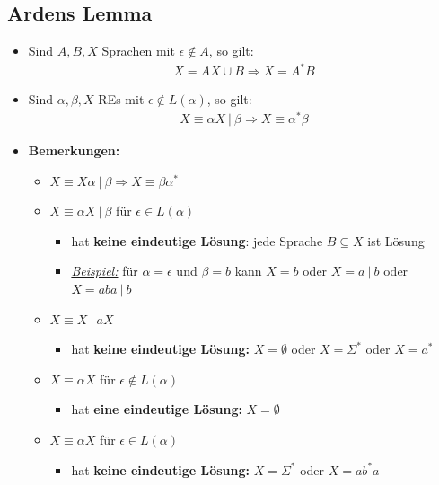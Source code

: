 \documentclass[ieeetran]{article}
\begin{document}
\subsection{Ardens Lemma} %
\label{sub:fA_}
\begin{itemize}
\item Sind $A, B, X$ Sprachen mit $\epsilon \not\in A$, so gilt:
	\large
	\begin{equation*}
	\boxed{
	\begin{aligned}
X = AX \cup B \Longrightarrow X = A^* B	
	\end{aligned}
	}
	\end{equation*}
	\normalsize
	
	\item Sind $\alpha, \beta, X$ REs mit $\epsilon \not\in L(\alpha)$, so gilt:
\large
\begin{equation*}
\boxed{
\begin{aligned}
	X \equiv \alpha X \ | \ \beta \Longrightarrow X \equiv \alpha^* \beta 
\end{aligned}
}
\end{equation*}
\normalsize

\item \textbf{Bemerkungen:}
	\begin{itemize}
		\item $X \equiv X\alpha \ | \ \beta \Longrightarrow X \equiv \beta \alpha^*$
		\item $X \equiv \alpha X \ | \ \beta$ für $\epsilon \in L(\alpha)$
		\begin{itemize}
		\item hat \textbf{keine eindeutige Lösung}: jede Sprache $B \subseteq X$ ist Lösung
		  \item \textit{\underline{Beispiel:}} für $\alpha = \epsilon$ und $\beta = b$ kann $X = b$ oder $X = a \ | \ b$ oder $X = aba \ | \ b$
		\end{itemize}
	
	\item $X \equiv X \ | \ aX$
		\begin{itemize}
		  \item hat \textbf{keine eindeutige Lösung:} $X = \emptyset$ oder $X = \Sigma^*$ oder $X = a^*$
		\end{itemize}
	
		\item $X \equiv \alpha X$ für $\epsilon \not\in L(\alpha)$
			\begin{itemize}
			  \item hat \textbf{eine eindeutige Lösung:} $X = \emptyset$
			\end{itemize}
		\item $X \equiv \alpha X$ für $\epsilon \in L(\alpha)$
			\begin{itemize}
				\item hat \textbf{keine eindeutige Lösung:} $X = \Sigma^*$ oder $X = ab^*a$
			\end{itemize}


\end{itemize}
\end{itemize}
\end{document}
